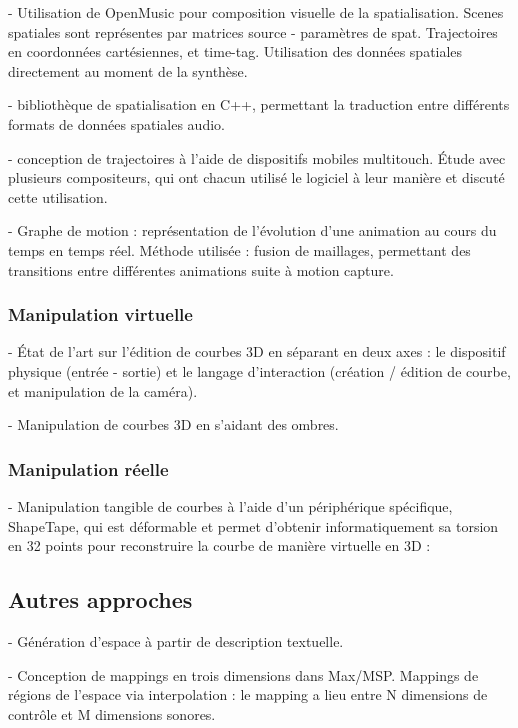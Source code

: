 \documentclass[french,12pt]{article}
\begin{document}
- Utilisation de OpenMusic pour composition visuelle de la spatialisation. Scenes spatiales sont représentes par matrices source - paramètres de spat. Trajectoires en coordonnées cartésiennes, et time-tag. Utilisation des données spatiales directement au moment de la synthèse.
\cite{bresson_spatial_2012}

- bibliothèque de spatialisation en C++, permettant la traduction entre différents formats de données spatiales audio.
\cite{wozniewski_spatosc:_2012}

- conception de trajectoires à l'aide de dispositifs mobiles multitouch. Étude avec plusieurs compositeurs, qui ont chacun utilisé le logiciel à leur manière et discuté cette utilisation.
\cite{favory_trajectoires:_2015}

- Graphe de motion : représentation de l'évolution d'une animation au cours du temps en temps réel. Méthode utilisée : fusion de maillages, permettant des transitions entre différentes animations suite à motion capture. %
\cite{casas_4d_2013}


\subsubsection{Manipulation virtuelle}
- État de l'art sur l'édition de courbes 3D en séparant en deux axes : le dispositif physique (entrée - sortie) et le langage d'interaction (création / édition de courbe, et manipulation de la caméra).
\cite{jacob_design_2014} %

- Manipulation de courbes 3D en s'aidant des ombres.
\cite{cohen_interface_1999}

\subsubsection{Manipulation réelle}
- Manipulation tangible de courbes à l'aide d'un périphérique spécifique, ShapeTape, qui est déformable et permet d'obtenir informatiquement sa torsion en 32 points pour reconstruire la courbe de manière virtuelle en 3D : 
\cite{grossman_interface_2003}

\subsection{Autres approches}
- Génération d'espace à partir de description textuelle.
\cite{andriamarozakaniaina_du_2012} 

- Conception de mappings en trois dimensions dans Max/MSP. Mappings de régions de l'espace via interpolation : le mapping a lieu entre N dimensions de contrôle et M dimensions sonores.
\cite{van_nort_lom_2006}
\end{document}
